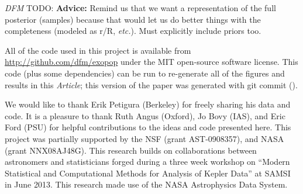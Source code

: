 \documentclass[12pt,preprint]{aastex}
\newcommand{\project}[1]{{\sffamily #1}}
\newcommand{\paper}{\textsl{Article}}
\newcommand{\foreign}[1]{\emph{#1}}
\newcommand{\etc}{\foreign{etc.}}
\newcommand{\todo}[3]{{\color{#2} \emph{#1} TODO: #3}}
\newcommand{\dfmtodo}[1]{\todo{DFM}{red}{#1}}
\begin{document}
\dfmtodo{%
{\bf Advice:} \quad
Remind us that we want a representation of the full posterior (samples)
because that would let us do better things with the completeness (modeled as
r/R, \etc).
Must explicitly include priors too.
}


All of the code used in this project is available from
\url{http://github.com/dfm/exopop} under the MIT open-source software license.
This code (plus some dependencies) can be run to re-generate all of the
figures and results in this \paper; this version of the paper was generated
with git commit \texttt{\githash} (\gitdate).

\acknowledgments
We would like to thank Erik Petigura (Berkeley) for freely sharing his data
and code.
It is a pleasure to thank
Ruth Angus (Oxford),
Jo Bovy (IAS), and
Eric Ford (PSU)
for helpful contributions to the ideas and code presented here.
This project was partially supported by the NSF (grant AST-0908357), and NASA
(grant NNX08AJ48G).
This research builds on collaborations between astronomers and statisticians
forged during a three week workshop on ``Modern Statistical and Computational
Methods for Analysis of Kepler Data'' at SAMSI in June 2013.
This research made use of the NASA \project{Astrophysics Data System}.
\end{document}
